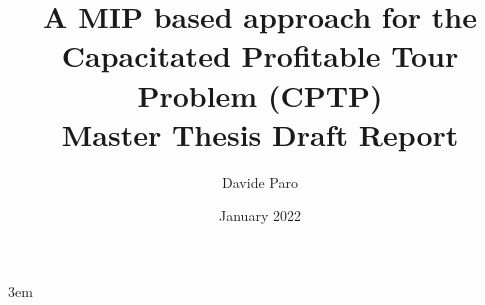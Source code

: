 \newcommand{\DebugBuild}{0}

\linespread{1.25}             %
\setlength{\parindent}{0pt}   %
\setlength{\parskip}{1em}     %


\setcounter{tocdepth}{2}       %

\setcounter{secnumdepth}{5}       %


\title{A MIP based approach for the Capacitated Profitable Tour Problem (CPTP)\\
	\Large{Master Thesis Draft Report}}
\date{January 2022}
\author{Davide Paro}





\emergencystretch 3em
